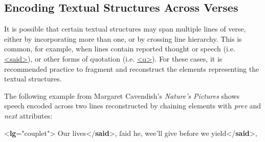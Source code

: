 \subsection[{Encoding Textual Structures Across Verses}]{Encoding Textual Structures Across Verses}\label{VESA}\par
It is possible that certain textual structures may span multiple lines of verse, either by incorporating more than one, or by crossing line hierarchy. This is common, for example, when lines contain reported thought or speech (i.e. \hyperref[TEI.said]{<said>}), or other forms of quotation (i.e. \hyperref[TEI.q]{<q>}). For these cases, it is recommended practice to fragment and reconstruct the elements representing the textual structures.\par
The following example from Margaret Cavendish's \textit{Nature's Pictures} shows speech encoded across two lines reconstructed by chaining elements with {\itshape prev} and {\itshape next} attributes: \par\bgroup{}\exampleFont \begin{shaded}\noindent\mbox{}{<\textbf{lg}\hspace*{1em}{type}="{couplet}">}\mbox{}\newline 
{}\mbox{}\newline 
\hspace*{1em}Our lives{</\textbf{said}>}, ſaid he,\mbox{}\newline 
{}wee'll give before we yield{</\textbf{said}>},\mbox{}\newline 

\end{shaded}
